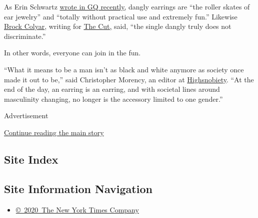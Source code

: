 As Erin Schwartz
\href{https://www.gq.com/story/dangly-earrings-rule}{wrote in GQ
recently,} dangly earrings are ``the roller skates of ear jewelry'' and
``totally without practical use and extremely fun.'' Likewise
\href{https://www.thecut.com/author/brock-colyar/}{Brock Colyar},
writing for
\href{https://www.thecut.com/2019/08/what-does-a-single-earring-mean-on-a-man.html}{The
Cut,} said, ``the single dangly truly does not discriminate.''

In other words, everyone can join in the fun.

``What it means to be a man isn't as black and white anymore as society
once made it out to be,'' said Christopher Morency, an editor at
\href{https://www.highsnobiety.com/}{Highsnobiety}. ``At the end of the
day, an earring is an earring, and with societal lines around
masculinity changing, no longer is the accessory limited to one
gender.''

Advertisement

\protect\hyperlink{after-bottom}{Continue reading the main story}

\hypertarget{site-index}{%
\subsection{Site Index}\label{site-index}}

\hypertarget{site-information-navigation}{%
\subsection{Site Information
Navigation}\label{site-information-navigation}}

\begin{itemize}
\tightlist
\item
  \href{https://help.nytimes.com/hc/en-us/articles/115014792127-Copyright-notice}{©~2020~The
  New York Times Company}
\end{itemize}

